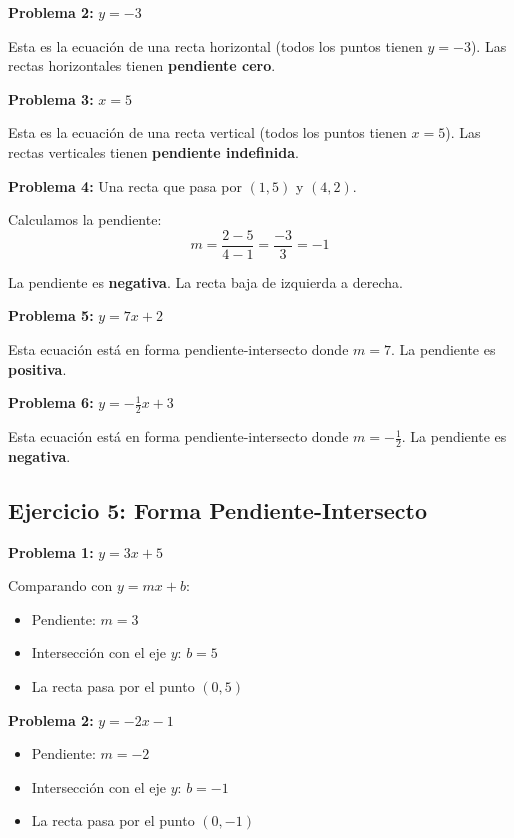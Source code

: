 \medskip

\textbf{Problema 2:} $y = -3$

Esta es la ecuación de una recta horizontal (todos los puntos tienen $y = -3$). Las rectas horizontales tienen \textbf{pendiente cero}.

\medskip

\textbf{Problema 3:} $x = 5$

Esta es la ecuación de una recta vertical (todos los puntos tienen $x = 5$). Las rectas verticales tienen \textbf{pendiente indefinida}.

\medskip

\textbf{Problema 4:} Una recta que pasa por $(1, 5)$ y $(4, 2)$.

Calculamos la pendiente:
$$m = \frac{2 - 5}{4 - 1} = \frac{-3}{3} = -1$$

La pendiente es \textbf{negativa}. La recta baja de izquierda a derecha.

\medskip

\textbf{Problema 5:} $y = 7x + 2$

Esta ecuación está en forma pendiente-intersecto donde $m = 7$. La pendiente es \textbf{positiva}.

\medskip

\textbf{Problema 6:} $y = -\frac{1}{2}x + 3$

Esta ecuación está en forma pendiente-intersecto donde $m = -\frac{1}{2}$. La pendiente es \textbf{negativa}.

\newpage

\subsection*{Ejercicio 5: Forma Pendiente-Intersecto}

\textbf{Problema 1:} $y = 3x + 5$

Comparando con $y = mx + b$:
\begin{itemize}
    \item Pendiente: $m = 3$
    \item Intersección con el eje $y$: $b = 5$
    \item La recta pasa por el punto $(0, 5)$
\end{itemize}

\medskip

\textbf{Problema 2:} $y = -2x - 1$

\begin{itemize}
    \item Pendiente: $m = -2$
    \item Intersección con el eje $y$: $b = -1$
    \item La recta pasa por el punto $(0, -1)$
\end{itemize}

